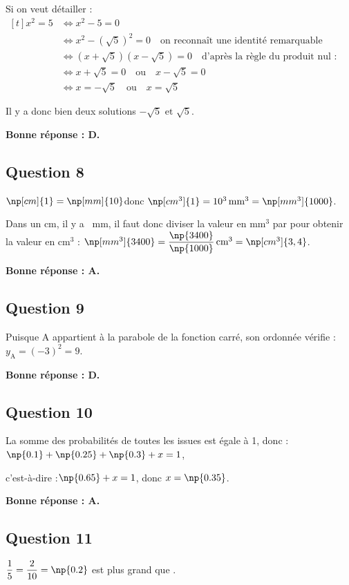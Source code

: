 	Si on veut détailler :\quad $\begin{aligned}[t]
		x^2 = 5
		&\iff x^2 - 5 = 0\\
		&\iff x^2 - \left(\sqrt{5}\right)^2 = 0\quad \text{on reconnaît une identité remarquable}\\
		&\iff \left(x+\sqrt5\right)\left(x-\sqrt5\right) = 0\quad\text{d'après la règle du produit nul :}\\
		&\iff x+\sqrt5 = 0 \quad \text{ou}\quad x-\sqrt5=0\\
		&\iff x=-\sqrt5 \quad \text{ou}\quad x =\sqrt5
	\end{aligned}$

	Il y a donc bien deux solutions $-\sqrt5\text{ et }\sqrt5$.

	\textbf{Bonne réponse : D.}

\subsection*{Question 8}
	$\np[cm]{1} = \np[mm]{10}$\quad donc \quad $\np[cm^3]{1} = 10^3\,\text{mm}^3 = \np[mm^3]{1000}$.

	Dans un cm, il y a ~mm, il faut donc diviser la valeur en mm$^3$ par  pour obtenir la valeur en cm$^3$ :
	\quad
	$\np[mm^3]{3400} = \dfrac{\np{3400}}{\np{1000}}\,\text{cm}^3 = \np[cm^3]{3,4}$.

	\textbf{Bonne réponse : A.}

\subsection*{Question 9}
	Puisque A appartient à la parabole de la fonction carré, son ordonnée vérifie :\quad $y_\text{A} = (-3)^2 = 9$.

	\textbf{Bonne réponse : D.}

\subsection*{Question 10}
	La somme des probabilités de toutes les issues est égale à 1, donc : \quad  $\np{0.1}+\np{0.25}+\np{0.3}+x = 1$,

	c'est-à-dire :\quad $\np{0.65}+x = 1$, \quad donc \quad $x = \np{0.35}$.

	\textbf{Bonne réponse : A.}

\subsection*{Question 11}
	$\dfrac15 = \dfrac{2}{10} = \np{0.2}$ est plus grand que .

